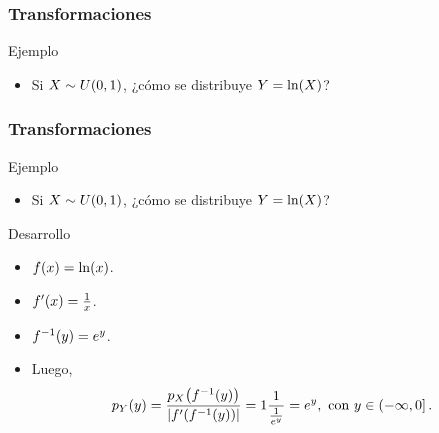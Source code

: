 \documentclass[table]{beamer}
\begin{document}
\begin{frame}
    \frametitle{Transformaciones}
    \begin{exampleblock}{Ejemplo}
        \begin{itemize}
            \item Si $X \sim \uniform{0}{1}$, ¿cómo se distribuye $Y = \ln \parens{X}$?
        \end{itemize}
    \end{exampleblock}
    \begin{center}
    \end{center}
\end{frame}

\begin{frame}
    \frametitle{Transformaciones}
    \begin{exampleblock}{Ejemplo}
        \begin{itemize}
            \item Si $X \sim \uniform{0}{1}$, ¿cómo se distribuye $Y = \ln \parens{X}$?
        \end{itemize}
    \end{exampleblock}
    \begin{block}{Desarrollo}
        \begin{itemize}
            \item $\ff{x} = \ln \parens{x}$.
            \item $f' \parens{x} = \frac{1}{x}$.
            \item $f^{-1} \parens{y} = e^{y}$.
            \item Luego,
                \begin{equation*}
                    \ppdf{Y}{y}
                    = \frac{\ppdf{X}{f^{-1} \parens{y}}}{\vparens{f' \parens{f^{-1} \parens{y}}}}
                    = 1 \frac{1}{\frac{1}{e^{y}}}
                    = e^{y} , \text{ con } y \in \left ( - \infty , 0 \right ] .
                \end{equation*}
        \end{itemize}
    \end{block}
\end{frame}
\end{document}
